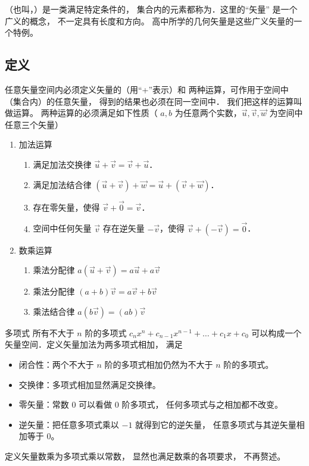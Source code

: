 

（也叫，）是一类满足特定条件的， 集合内的元素都称为．这里的“矢量” 是一个广义的概念， 不一定具有长度和方向。 高中所学的几何矢量是这些广义矢量的一个特例。

\subsection{定义}
任意矢量空间内必须定义矢量的（用“+”表示）和 两种运算，可作用于空间中（集合内）的任意矢量， 得到的结果也必须在同一空间中． 我们把这样的运算叫做运算。 两种运算的必须满足如下性质（ $a,b$ 为任意两个实数，$\vec u,\vec v,\vec w$ 为空间中任意三个矢量）
\begin{enumerate}
\item 加法运算
\begin{enumerate}
\item 满足加法交换律 $\vec u + \vec v = \vec v + \vec u$．
\item 满足加法结合律 $(\vec u + \vec v) + \vec w = \vec u + (\vec v + \vec w)$．
\item 存在零矢量，使得 $\vec v + \vec 0 = \vec v$．
\item 空间中任何矢量 $\vec v$ 存在逆矢量 $-\vec v$，使得 $\vec v + (-\vec v) = \vec 0$．
\end{enumerate}

\item 数乘运算
\begin{enumerate}
\item 乘法分配律 $a(\vec u + \vec v) = a\vec u + a\vec v$ 
\item 乘法分配律 $(a + b)\vec v = a\vec v + b\vec v$
\item 乘法结合律 $a (b \vec v) = (ab) \vec v$
\end{enumerate}
\end{enumerate}

\begin{exam}{多项式}
所有不大于 $n$ 阶的多项式 $c_n x^n + c_{n-1} x^{n-1} + \dots + c_1 x + c_0$ 可以构成一个矢量空间．定义矢量加法为两多项式相加， 满足
\begin{itemize}
\item 闭合性：两个不大于 $n$ 阶的多项式相加仍然为不大于 $n$ 阶的多项式。
\item 交换律：多项式相加显然满足交换律。
\item 零矢量：常数 0 可以看做 0 阶多项式， 任何多项式与之相加都不改变。
\item 逆矢量：把任意多项式乘以 $-1$ 就得到它的逆矢量， 任意多项式与其逆矢量相加等于 0。
\end{itemize}
定义矢量数乘为多项式乘以常数， 显然也满足数乘的各项要求， 不再赘述。
\end{exam}

